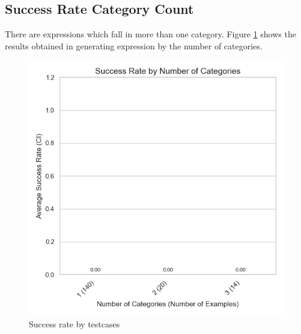 \subsection{Success Rate Category Count}

There are expressions which fall in more than one category.
Figure \ref{fig:success_rate_by_category_count} shows the results obtained in generating expression by the number of categories.

\begin{figure}[!h]
    \centering
    \includegraphics[width=0.55\linewidth]{fig/success_rate_by_category_count}
    \caption{Success rate by testcases}\label{fig:success_rate_by_category_count}
\end{figure}
